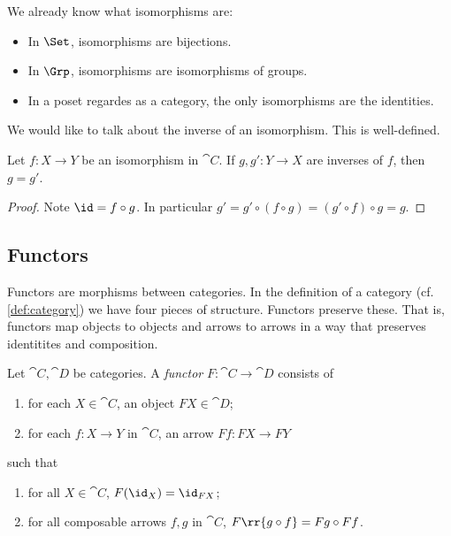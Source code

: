 \documentclass{article}
\begin{document}
\begin{example}
  We already know what isomorphisms are:
  \begin{itemize}
    \item In $\Set$, isomorphisms are bijections.
    \item In $\Grp$, isomorphisms are isomorphisms of groups.
    \item In a poset regardes as a category, the only isomorphisms are the
      identities.
  \end{itemize}
\end{example}

We would like to talk about the inverse of an isomorphism. This is well-defined.

\begin{proposition}
  Let $f:X\to Y$ be an isomorphism in $\cat{C}$. If $g,g':Y\to X$ are inverses of
  $f$, then $g=g'$.
  \begin{proof}
    Note $\id=f\circ g$. In particular $g'=g'\circ(f\circ g) = (g'\circ f)\circ g=g$.
  \end{proof}
\end{proposition}

\subsection{Functors}

Functors are morphisms between categories. In the definition of a category (cf.
\ref{def:category}) we have four pieces of structure. Functors preserve these.
That is, functors map objects to objects and arrows to arrows in a way that
preserves identitites and composition.

\begin{definition}\label{def:functor}
  Let $\cat{C},\cat{D}$ be categories. A \emph{functor} $F:\cat{C}\to\cat{D}$
  consists of
  \begin{enumerate}
    \item for each $X\in\cat{C}$, an object $FX\in\cat{D}$;
    \item for each $f:X\to Y$ in $\cat{C}$, an arrow $Ff:FX\to FY$
  \end{enumerate}
  such that
  \begin{enumerate}
    \item for all $X\in\cat{C}$, $F(\id_X)=\id_{FX}$;
    \item for all composable arrows $f,g$ in $\cat{C}$, $F\rr{g\circ f}=Fg\circ Ff$.
  \end{enumerate}
\end{definition}
\end{document}
